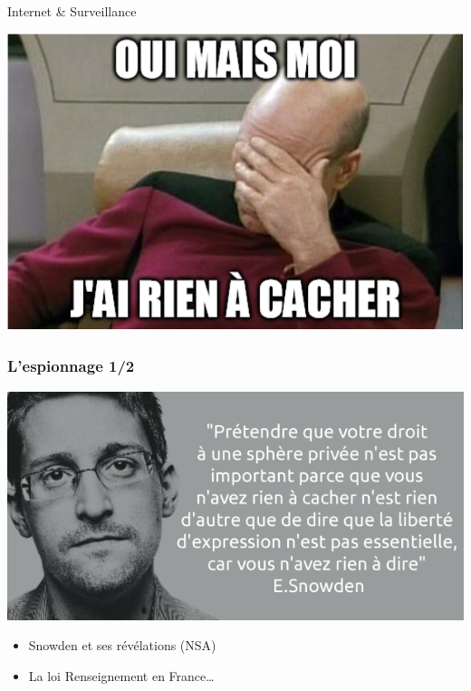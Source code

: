 \documentclass{beamer}
\begin{document}
\begin{frame}
\begin{center}
\Huge{Internet \& Surveillance}
\end{center}
\end{frame}
\begin{frame}
\begin{center}
\includegraphics[scale=0.5] {./images/nothingtohide.png} 
\end{center}
\end{frame}

\begin{frame}
\frametitle{L'espionnage 1/2}
\begin{center}
\includegraphics[scale=0.4]{./images/snowden.png}
\end{center}
\begin{itemize}
\item Snowden et ses révélations (NSA)
\item La loi Renseignement en France…
\end{itemize}
\end{frame}
\end{document}
